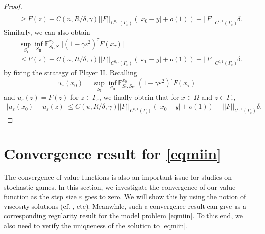 \documentclass[english]{amsart}
\newcommand{\eps}{\varepsilon}
\theoremstyle{plain}
\theoremstyle{definition}
\theoremstyle{remark}
\numberwithin{equation}{section}
\begin{document}
\begin{proof}
\begin{align*}
\\ & \ge F(z)-C(n,  R/\delta, \gamma)||F||_{C^{0,1}(\Gamma_{\eps})}( |x_0-y|+o(1)) -||F||_{C^{0,1}(\Gamma_{\eps})}\delta .
\end{align*}
Similarly, we can also obtain 
\begin{align*}
&\sup_{S_{\textrm{I}}}\inf_{S_{\textrm{II}}}\mathbb{E}_{S_{\textrm{I}},S_{\textrm{II}}}^{x_0}\big[(1-\gamma \eps^2)^{\tau}F(x_{\tau})\big]
\\ & \le F(z)+C(n,  R/\delta, \gamma)||F||_{C^{0,1}(\Gamma_{\eps})}( |x_0-y|+o(1)) +||F||_{C^{0,1}(\Gamma_{\eps})}\delta .
\end{align*}
by fixing the strategy of Player II.
Recalling
$$u_{\eps}(x_0)= \sup_{S_{\textrm{I}}}\inf_{S_{\textrm{II}}}\mathbb{E}_{S_{\textrm{I}},S_{\textrm{II}}}^{x_0}\big[(1-\gamma \eps^2)^{\tau}F(x_{\tau})\big] $$
and $u_{\eps}(z)=F(z)$ for $z\in \Gamma_{\eps}$,
we finally obtain that for $x \in \Omega$ and $z \in \Gamma_{\eps}$,
\begin{align*}
 |u_{\eps}(x_0)-u_{\eps}(z)|   \le C(n,  R/\delta, \gamma)||F||_{C^{0,1}(\Gamma_{\eps})}( |x_0-y|+o(1)) +||F||_{C^{0,1}(\Gamma_{\eps})}\delta .
\end{align*}
\end{proof}

\section{Convergence result for \eqref{eqmiin}}
\label{sec:con}
The convergence of value functions is also an important issue for studies on stochastic games.
In this section, we investigate the convergence of our value function as the step size $\eps$ goes to zero.
We will show this by using the notion of viscosity solutions (cf. \cite{MR3011990,MR2875296,MR3441079}, etc).
Meanwhile, such a convergence result can give us a corresponding regularity result for the model problem \eqref{eqmiin}.
To this end, we also need to verify the uniqueness of the solution to \eqref{eqmiin}.
\end{document}
